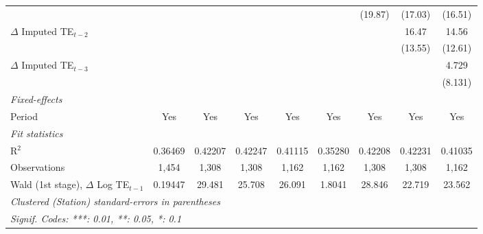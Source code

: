 \begin{table}[htbp]
\begin{tabular}{lcccccccc}
                                                 &           &               &               &               &               & (19.87)      & (17.03)      & (16.51)\\   
      $\Delta$ Imputed TE$_{t-2}$                &           &               &               &               &               &              & 16.47        & 14.56\\   
                                                 &           &               &               &               &               &              & (13.55)      & (12.61)\\   
      $\Delta$ Imputed TE$_{t-3}$                &           &               &               &               &               &              &              & 4.729\\   
                                                 &           &               &               &               &               &              &              & (8.131)\\   
      \midrule
      \emph{Fixed-effects}\\
      Period                                     & Yes       & Yes           & Yes           & Yes           & Yes           & Yes          & Yes          & Yes\\  
      \midrule
      \emph{Fit statistics}\\
      R$^2$                                      & 0.36469   & 0.42207       & 0.42247       & 0.41115       & 0.35280       & 0.42208      & 0.42231      & 0.41035\\  
      Observations                               & 1,454     & 1,308         & 1,308         & 1,162         & 1,162         & 1,308        & 1,308        & 1,162\\  
      Wald (1st stage), $\Delta$ Log TE$_{t-1}$  & 0.19447   & 29.481        & 25.708        & 26.091        & 1.8041        & 28.846       & 22.719       & 23.562\\  
      \midrule \midrule
      \multicolumn{9}{l}{\emph{Clustered (Station) standard-errors in parentheses}}\\
      \multicolumn{9}{l}{\emph{Signif. Codes: ***: 0.01, **: 0.05, *: 0.1}}\\
   \end{tabular}
\end{table}


